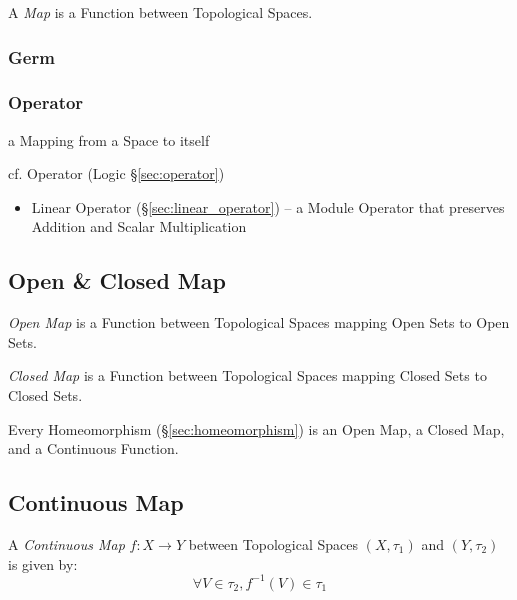 A \emph{Map} is a Function between Topological Spaces.



\subsubsection{Germ}\label{sec:germ}

\subsubsection{Operator}\label{sec:space_operator}

a Mapping from a Space to itself

cf. Operator (Logic \S\ref{sec:operator})

\begin{itemize}
  \item Linear Operator (\S\ref{sec:linear_operator}) -- a Module Operator that
    preserves Addition and Scalar Multiplication
\end{itemize}



\subsection{Open \& Closed Map}\label{sec:open_closed_map}

\emph{Open Map} is a Function between Topological Spaces mapping Open
Sets to Open Sets.

\emph{Closed Map} is a Function between Topological Spaces mapping Closed
Sets to Closed Sets.

Every Homeomorphism (\S\ref{sec:homeomorphism}) is an Open Map, a
Closed Map, and a Continuous Function.



\subsection{Continuous Map}\label{sec:continuous_map}

A \emph{Continuous Map} $f : X \rightarrow Y$ between Topological
Spaces $(X,\tau_1)$ and $(Y,\tau_2)$ is given by:
\[
  \forall V \in \tau_2, f^{-1}(V) \in \tau_1
\]

